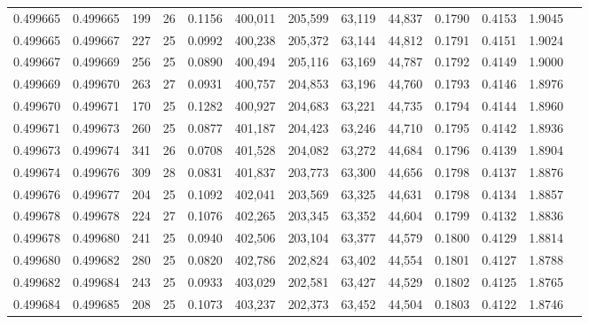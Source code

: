 \begin{tabular}{rrrrrrrrrrrrr}
0.499665 & 0.499665 & 199 &  26 &                                     0.1156 & 400,011 & 205,599 &  63,119 &  44,837 & 0.1790 & 0.4153 & 1.9045 \\
0.499665 & 0.499667 & 227 &  25 &                                     0.0992 & 400,238 & 205,372 &  63,144 &  44,812 & 0.1791 & 0.4151 & 1.9024 \\
0.499667 & 0.499669 & 256 &  25 &                                     0.0890 & 400,494 & 205,116 &  63,169 &  44,787 & 0.1792 & 0.4149 & 1.9000 \\
0.499669 & 0.499670 & 263 &  27 &                                     0.0931 & 400,757 & 204,853 &  63,196 &  44,760 & 0.1793 & 0.4146 & 1.8976 \\
0.499670 & 0.499671 & 170 &  25 &                                     0.1282 & 400,927 & 204,683 &  63,221 &  44,735 & 0.1794 & 0.4144 & 1.8960 \\
0.499671 & 0.499673 & 260 &  25 &                                     0.0877 & 401,187 & 204,423 &  63,246 &  44,710 & 0.1795 & 0.4142 & 1.8936 \\
0.499673 & 0.499674 & 341 &  26 &                                     0.0708 & 401,528 & 204,082 &  63,272 &  44,684 & 0.1796 & 0.4139 & 1.8904 \\
0.499674 & 0.499676 & 309 &  28 &                                     0.0831 & 401,837 & 203,773 &  63,300 &  44,656 & 0.1798 & 0.4137 & 1.8876 \\
0.499676 & 0.499677 & 204 &  25 &                                     0.1092 & 402,041 & 203,569 &  63,325 &  44,631 & 0.1798 & 0.4134 & 1.8857 \\
0.499678 & 0.499678 & 224 &  27 &                                     0.1076 & 402,265 & 203,345 &  63,352 &  44,604 & 0.1799 & 0.4132 & 1.8836 \\
0.499678 & 0.499680 & 241 &  25 &                                     0.0940 & 402,506 & 203,104 &  63,377 &  44,579 & 0.1800 & 0.4129 & 1.8814 \\
0.499680 & 0.499682 & 280 &  25 &                                     0.0820 & 402,786 & 202,824 &  63,402 &  44,554 & 0.1801 & 0.4127 & 1.8788 \\
0.499682 & 0.499684 & 243 &  25 &                                     0.0933 & 403,029 & 202,581 &  63,427 &  44,529 & 0.1802 & 0.4125 & 1.8765 \\
0.499684 & 0.499685 & 208 &  25 &                                     0.1073 & 403,237 & 202,373 &  63,452 &  44,504 & 0.1803 & 0.4122 & 1.8746 \\

\end{tabular}
